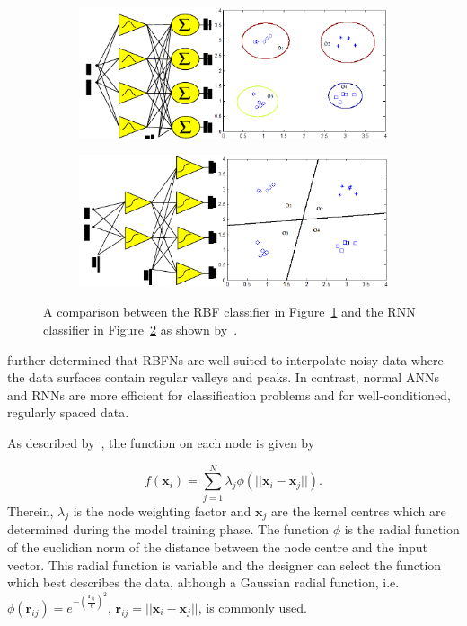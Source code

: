 \begin{figure}
  \centering
  \begin{subfigure}{0.5\textwidth}
    \includegraphics[width=\textwidth]{figures/chapter2/rbf_class}
    \caption{}
    \label{fig:chap2-rbf-classifier}
  \end{subfigure}
  \begin{subfigure}{0.5\textwidth}
    \includegraphics[width=\textwidth]{figures/chapter2/rnn_class}
    \caption{}
    \label{fig:chap2-rnn-classifier}
  \end{subfigure}
  \caption[A comparison between the RBF and RNN classifiers. ]{A comparison between the RBF classifier in Figure~\ref{fig:chap2-rbf-classifier} and the RNN classifier in Figure~\ref{fig:chap2-rnn-classifier} as shown by~\cite{xie2011comparison}. }
\label{fig:chap2-classifier}
\end{figure}

\citeauthor{xie2011comparison} further determined that RBFNs are well suited to interpolate noisy data where the data surfaces contain regular valleys and peaks. In contrast, normal ANNs and RNNs are more efficient for classification problems and for well-conditioned, regularly spaced data. 

As described by~\cite{skala2012radial}, the function on each node is given by 

\begin{equation}
  \label{eq:chap2-rbf}
  f(\bm{x}_i) = \sum\limits_{j = 1}^{N}\lambda_j \phi(|| \bm{x}_i - \bm{x}_j ||).
\end{equation}
Therein, $\lambda_j$ is the node weighting factor and $\bm{x}_j$ are the kernel centres which are determined during the model training phase. The function $\phi$ is the radial function of the euclidian norm of the distance between the node centre and the input vector. This radial function is variable and the designer can select the function which best describes the data, although a Gaussian radial function, i.e.\ $\phi(\bm{r}_{ij}) = e^{-(\frac{\bm{r}_{ij}}{\epsilon})^2}$, $\bm{r}_{ij} = || \bm{x}_i - \bm{x}_j ||$, is commonly used.  

